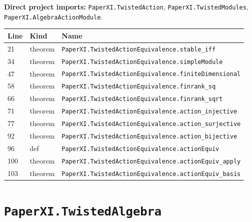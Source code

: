 \documentclass[10pt,oneside]{book}
\begin{document}

\textbf{Direct project imports:} \nolinkurl{PaperXI.TwistedAction}, \nolinkurl{PaperXI.TwistedModules}, \nolinkurl{PaperXI.AlgebraActionModule}.

\begin{longtable}{@{}p{}p{}p{}@{}}\toprule Line&Kind&Name\\\midrule\endhead

21&theorem&\nolinkurl{PaperXI.TwistedActionEquivalence.stable_iff}\\

34&theorem&\nolinkurl{PaperXI.TwistedActionEquivalence.simpleModule}\\

47&theorem&\nolinkurl{PaperXI.TwistedActionEquivalence.finiteDimensional}\\

58&theorem&\nolinkurl{PaperXI.TwistedActionEquivalence.finrank_sq}\\

66&theorem&\nolinkurl{PaperXI.TwistedActionEquivalence.finrank_sqrt}\\

71&theorem&\nolinkurl{PaperXI.TwistedActionEquivalence.action_injective}\\

77&theorem&\nolinkurl{PaperXI.TwistedActionEquivalence.action_surjective}\\

92&theorem&\nolinkurl{PaperXI.TwistedActionEquivalence.action_bijective}\\

96&def&\nolinkurl{PaperXI.TwistedActionEquivalence.actionEquiv}\\

100&theorem&\nolinkurl{PaperXI.TwistedActionEquivalence.actionEquiv_apply}\\

103&theorem&\nolinkurl{PaperXI.TwistedActionEquivalence.actionEquiv_basis}\\

\bottomrule\end{longtable}

\section{\texorpdfstring{\nolinkurl{PaperXI.TwistedAlgebra}}{PaperXI.TwistedAlgebra}}\label{module:PaperXI.TwistedAlgebra}
\end{document}
